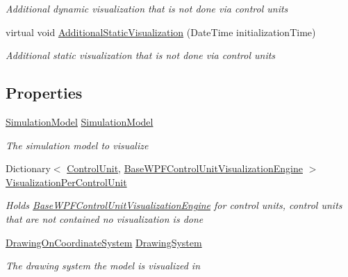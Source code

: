 \begin{DoxyCompactItemize}
\begin{DoxyCompactList}\small\item\em Additional dynamic visualization that is not done via control units \end{DoxyCompactList}\item 
virtual void \hyperlink{class_simulation_w_p_f_visualization_tools_1_1_base_w_p_f_model_visualization_a6ff4500e25ffd6a1032f372923d07ed3}{Additional\+Static\+Visualization} (Date\+Time initialization\+Time)
\begin{DoxyCompactList}\small\item\em Additional static visualization that is not done via control units \end{DoxyCompactList}\end{DoxyCompactItemize}
\subsection*{Properties}
\begin{DoxyCompactItemize}
\item 
\hyperlink{class_simulation_core_1_1_simulation_classes_1_1_simulation_model}{Simulation\+Model} \hyperlink{class_simulation_w_p_f_visualization_tools_1_1_base_w_p_f_model_visualization_a50f6b111bff56cd4c29ff0fa67e43b6b}{Simulation\+Model}
\begin{DoxyCompactList}\small\item\em The simulation model to visualize \end{DoxyCompactList}\item 
Dictionary$<$ \hyperlink{class_simulation_core_1_1_h_c_c_m_elements_1_1_control_unit}{Control\+Unit}, \hyperlink{class_simulation_w_p_f_visualization_tools_1_1_base_w_p_f_control_unit_visualization_engine}{Base\+W\+P\+F\+Control\+Unit\+Visualization\+Engine} $>$ \hyperlink{class_simulation_w_p_f_visualization_tools_1_1_base_w_p_f_model_visualization_a35bd92df2526f5c9044075486fdadbeb}{Visualization\+Per\+Control\+Unit}
\begin{DoxyCompactList}\small\item\em Holds \hyperlink{class_simulation_w_p_f_visualization_tools_1_1_base_w_p_f_control_unit_visualization_engine}{Base\+W\+P\+F\+Control\+Unit\+Visualization\+Engine} for control units, control units that are not contained no visualization is done \end{DoxyCompactList}\item 
\hyperlink{class_w_p_f_visualization_base_1_1_drawing_on_coordinate_system}{Drawing\+On\+Coordinate\+System} \hyperlink{class_simulation_w_p_f_visualization_tools_1_1_base_w_p_f_model_visualization_a6ddba54c1d3d393225c7b4fbcf617f31}{Drawing\+System}
\begin{DoxyCompactList}\small\item\em The drawing system the model is visualized in \end{DoxyCompactList}\end{DoxyCompactItemize}


